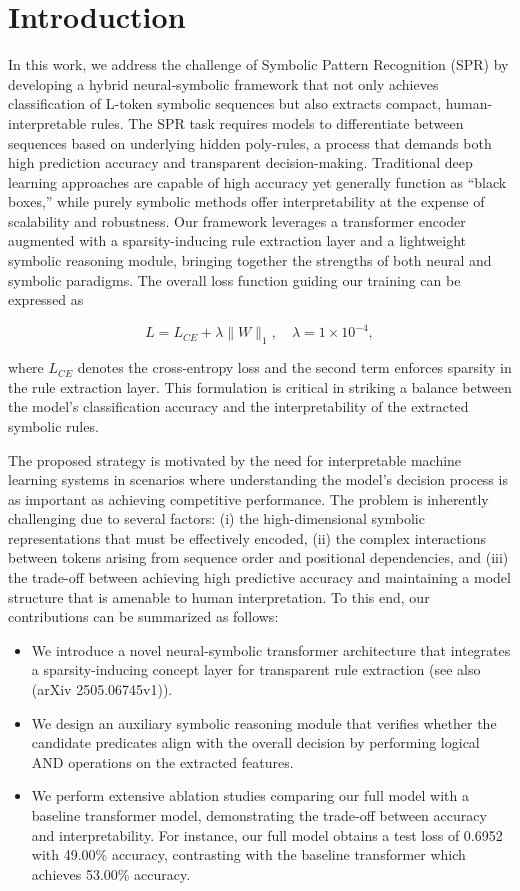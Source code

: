 \documentclass{article}
\begin{document}
\section{Introduction}
In this work, we address the challenge of Symbolic Pattern Recognition (SPR) by developing a hybrid neural‐symbolic framework that not only achieves classification of L-token symbolic sequences but also extracts compact, human-interpretable rules. The SPR task requires models to differentiate between sequences based on underlying hidden poly‐rules, a process that demands both high prediction accuracy and transparent decision-making. Traditional deep learning approaches are capable of high accuracy yet generally function as “black boxes,” while purely symbolic methods offer interpretability at the expense of scalability and robustness. Our framework leverages a transformer encoder augmented with a sparsity-inducing rule extraction layer and a lightweight symbolic reasoning module, bringing together the strengths of both neural and symbolic paradigms. The overall loss function guiding our training can be expressed as

\[
L = L_{CE} + \lambda \|W\|_1, \quad \lambda=1 \times 10^{-4},
\]

where \( L_{CE} \) denotes the cross-entropy loss and the second term enforces sparsity in the rule extraction layer. This formulation is critical in striking a balance between the model’s classification accuracy and the interpretability of the extracted symbolic rules.

The proposed strategy is motivated by the need for interpretable machine learning systems in scenarios where understanding the model’s decision process is as important as achieving competitive performance. The problem is inherently challenging due to several factors: (i) the high-dimensional symbolic representations that must be effectively encoded, (ii) the complex interactions between tokens arising from sequence order and positional dependencies, and (iii) the trade-off between achieving high predictive accuracy and maintaining a model structure that is amenable to human interpretation. To this end, our contributions can be summarized as follows:
\begin{itemize}
    \item We introduce a novel neural-symbolic transformer architecture that integrates a sparsity-inducing concept layer for transparent rule extraction (see also (arXiv 2505.06745v1)).
    \item We design an auxiliary symbolic reasoning module that verifies whether the candidate predicates align with the overall decision by performing logical AND operations on the extracted features.
    \item We perform extensive ablation studies comparing our full model with a baseline transformer model, demonstrating the trade-off between accuracy and interpretability. For instance, our full model obtains a test loss of 0.6952 with 49.00\% accuracy, contrasting with the baseline transformer which achieves 53.00\% accuracy.
\end{itemize}
\end{document}
